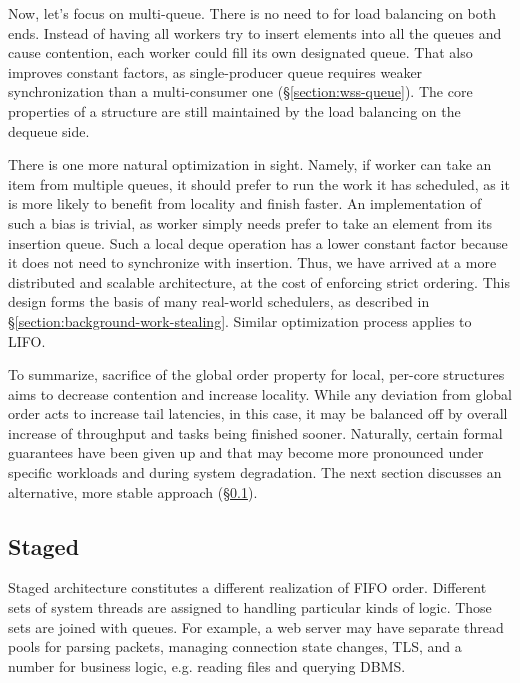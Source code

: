 \documentclass[12pt,a4paper,twoside]{report}
\begin{document}
Now, let's focus on multi-queue. There is no need to for load balancing on both ends. Instead of having all workers try to insert elements into all the queues and cause contention, each worker could fill its own designated queue. That also improves constant factors, as single-producer queue requires weaker synchronization than a multi-consumer one (\S\ref{section:wss-queue}). The core properties of a structure are still maintained by the load balancing on the dequeue side. 

There is one more natural optimization in sight. Namely, if worker can take an item from multiple queues, it should prefer to run the work it has scheduled, as it is more likely to benefit from locality and finish faster. An implementation of such a bias is trivial, as worker simply needs prefer to take an element from its insertion queue. Such a local deque operation has a lower constant factor because it does not need to synchronize with insertion. Thus, we have arrived at a more distributed and scalable architecture, at the cost of enforcing strict ordering. This design forms the basis of many real-world schedulers, as described in \S\ref{section:background-work-stealing}. Similar optimization process applies to LIFO. 

To summarize, sacrifice of the global order property for local, per-core structures aims to decrease contention and increase locality. While any deviation from global order acts to increase tail latencies, in this case, it may be balanced off by overall increase of throughput and tasks being finished sooner. Naturally, certain formal guarantees have been given up and that may become more pronounced under specific workloads and during system degradation. The next section discusses an alternative, more stable approach (\S\ref{section:design-staged}).
    
\subsection{Staged}
\label{section:design-staged}

Staged architecture \cite{Welsh2001} constitutes a different realization of FIFO order. Different sets of system threads are assigned to handling particular kinds of logic. Those sets are joined with queues. For example, a web server may have separate thread pools for parsing packets, managing connection state changes, TLS, and a number for business logic, e.g. reading files and querying DBMS.  
\end{document}
